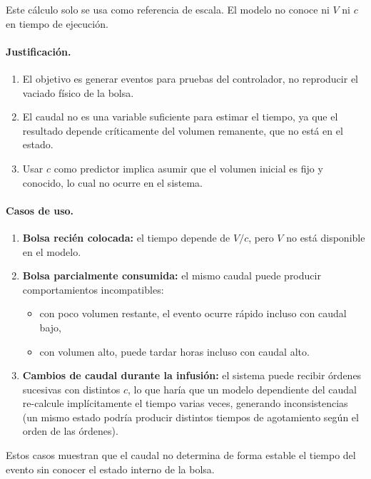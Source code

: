 \documentclass[11pt]{article}
\begin{document}
Este cálculo solo se usa como referencia de escala. El modelo no conoce ni $V$ ni $c$ en tiempo de ejecución.

\paragraph{Justificación.}
\begin{enumerate}
    \item El objetivo es generar eventos para pruebas del controlador, no reproducir el vaciado físico de la bolsa.
    \item El caudal no es una variable suficiente para estimar el tiempo, ya que el resultado depende críticamente del volumen remanente, que no está en el estado.
    \item Usar $c$ como predictor implica asumir que el volumen inicial es fijo y conocido, lo cual no ocurre en el sistema.
\end{enumerate}

\paragraph{Casos de uso.}
\begin{enumerate}
    \item \textbf{Bolsa recién colocada:} el tiempo depende de $V/c$, pero $V$ no está disponible en el modelo.
    
    \item \textbf{Bolsa parcialmente consumida:} el mismo caudal puede producir comportamientos incompatibles:
    \begin{itemize}
        \item con poco volumen restante, el evento ocurre rápido incluso con caudal bajo,
        \item con volumen alto, puede tardar horas incluso con caudal alto.
    \end{itemize}

    \item \textbf{Cambios de caudal durante la infusión:} el sistema puede recibir órdenes sucesivas con distintos $c$, lo que haría que un modelo dependiente del caudal re-calcule implícitamente el tiempo varias veces, generando inconsistencias (un mismo estado podría producir distintos tiempos de agotamiento según el orden de las órdenes).
\end{enumerate}

Estos casos muestran que el caudal no determina de forma estable el tiempo del evento sin conocer el estado interno de la bolsa.
\end{document}
